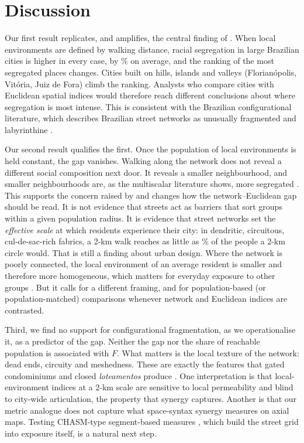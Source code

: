 \section{Discussion}\label{sec:discussion}

Our first result replicates, and amplifies, the central finding of \citet{knaap2024segregated}. When local
environments are defined by walking distance, racial segregation in large Brazilian cities is higher in every
case, by \meanPdH\% on average, and the ranking of the most segregated places changes. Cities built on hills,
islands and valleys (Florian\'opolis, Vit\'oria, Juiz de Fora) climb the ranking. Analysts who compare cities
with Euclidean spatial indices would therefore reach different conclusions about where segregation is most
intense. This is consistent with the Brazilian configurational literature, which describes Brazilian street
networks as unusually fragmented and labyrinthine \citep{medeiros2013urbis,holanda2002espaco}.

Our second result qualifies the first. Once the population of local environments is held constant, the gap
vanishes. Walking along the network does not reveal a different social composition next door. It reveals a
smaller neighbourhood, and smaller neighbourhoods are, as the multiscalar literature shows, more segregated
\citep{reardon2008geographic}. This supports the concern raised by \citet{saporito2026reconsidering} and changes
how the network--Euclidean gap should be read. It is not evidence that streets act as barriers that sort groups
within a given population radius. It is evidence that street networks set the \emph{effective scale} at which
residents experience their city: in dendritic, circuitous, cul-de-sac-rich fabrics, a 2-km walk reaches
as little as \ratioMin\% of the people a 2-km circle would. That is still a finding about urban design. Where the network
is poorly connected, the local environment of an average resident is smaller and therefore more homogeneous,
which matters for everyday exposure to other groups \citep{netto2015segregated}. But it calls for a different
framing, and for population-based (or population-matched) comparisons whenever network and Euclidean indices are
contrasted.

Third, we find no support for configurational fragmentation, as we operationalise it, as a predictor of the gap.
Neither the gap nor the share of reachable population is associated with $F$. What matters is the local
texture of the network: dead ends, circuity and meshedness. These are exactly the features that gated
condominiums and closed \emph{loteamentos} produce \citep{coy2006gated}. One interpretation is that
local-environment indices at a 2-km scale are sensitive to local permeability and blind to city-wide
articulation, the property that synergy captures. Another is that our metric analogue does not capture what
space-syntax synergy measures on axial maps. Testing CHASM-type segment-based measures \citep{saboya2025chasm},
which build the street grid into exposure itself, is a natural next step.

